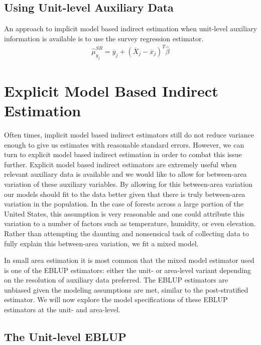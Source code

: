 \documentclass[12pt,twoside]{reedthesis}
\begin{document}
\hypertarget{using-unit-level-auxiliary-data}{%
\subsection{Using Unit-level Auxiliary Data}\label{using-unit-level-auxiliary-data}}

An approach to implicit model based indirect estimation when unit-level auxiliary information is available is to use the survey regression estimator.
\begin{align}
\hat \mu_{y_j}^{SR} = \overline y_j + (\overline X_j - \overline x_j)^T \hat\beta
\end{align}
\hypertarget{explicit-model-based-indirect-estimation}{%
\section{Explicit Model Based Indirect Estimation}\label{explicit-model-based-indirect-estimation}}

Often times, implicit model based indirect estimators still do not reduce variance enough to give us estimates with reasonable standard errors. However, we can turn to explicit model based indirect estimation in order to combat this issue further. Explicit model based indirect estimators are extremely useful when relevant auxiliary data is available and we would like to allow for between-area variation of these auxiliary variables. By allowing for this between-area variation our models should fit to the data better given that there is truly between-area variation in the population. In the case of forests across a large portion of the United States, this assumption is very reasonable and one could attribute this variation to a number of factors such as temperature, humidity, or even elevation. Rather than attempting the daunting and nonsensical task of collecting data to fully explain this between-area variation, we fit a mixed model.

In small area estimation it is most common that the mixed model estimator used is one of the EBLUP estimators: either the unit- or area-level variant depending on the resolution of auxiliary data preferred. The EBLUP estimators are unbiased given the modeling assumptions are met, similar to the post-stratified estimator. We will now explore the model specifications of these EBLUP estimators at the unit- and area-level.

\hypertarget{the-unit-level-eblup}{%
\subsection{The Unit-level EBLUP}\label{the-unit-level-eblup}}
\end{document}
